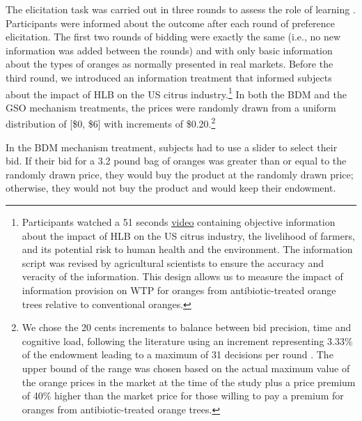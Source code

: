 \documentclass[12pt]{article}
\begin{document}
The elicitation task was carried out in three rounds to assess the role of learning \citep{corrigan2008testing, drichoutis2011role}. Participants were informed about the outcome after each round of preference elicitation.
The first two rounds of bidding were exactly the same (i.e., no new information was added between the rounds) and with only basic information about the types of oranges as normally presented in real markets. Before the third round, we introduced an information treatment that informed subjects about the impact of HLB on the US citrus industry.\footnote{Participants watched a 51 seconds \href{https://www.youtube.com/watch?v=_AqMBjB0ChM}{video} containing objective information about the impact of HLB on the US citrus industry, the livelihood of farmers, and its potential risk to human health and the environment. The information script was revised by agricultural scientists to ensure the accuracy and veracity of the information. This design allows us to measure the impact of information provision on WTP for oranges from antibiotic-treated orange trees relative to conventional oranges.} In both the BDM and the GSO mechanism treatments, the prices were randomly drawn from a uniform distribution of [\$0, \$6] with increments of \$0.20.\footnote{We chose the 20 cents increments to balance between bid precision, time and cognitive load, following the literature using an increment representing 3.33\% of the endowment leading to a maximum of 31 decisions per round \citep{li_obviously_2017, chakraborty_future_2025}. The upper bound of the range was chosen based on the actual maximum value of the orange prices in the market at the time of the study plus a price premium of 40\% higher than the market price for those willing to pay a premium for oranges from antibiotic-treated orange trees.}

In the BDM mechanism treatment, subjects had to use a slider to select their bid. If their bid for a 3.2 pound bag of oranges was greater than or equal to the randomly drawn price, they would buy the product at the randomly drawn price; otherwise, they would not buy the product and would keep their endowment.
\end{document}
